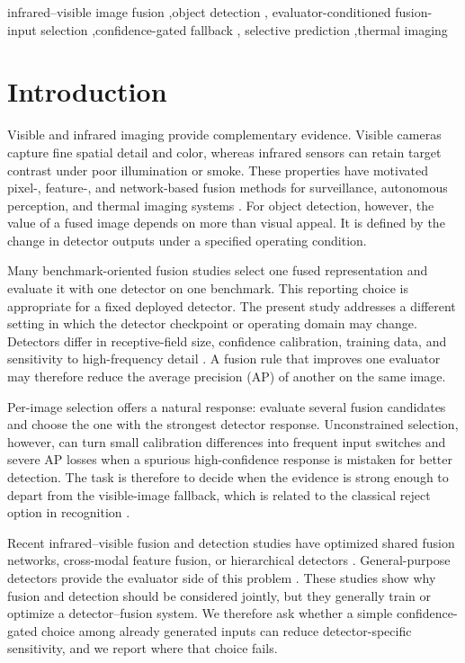 \documentclass[preprint,11pt]{elsarticle}
\begin{document}
\begin{frontmatter}
\begin{keyword}
infrared--visible image fusion \sep object detection \sep
evaluator-conditioned fusion-input selection \sep confidence-gated fallback \sep
selective prediction \sep thermal imaging
\end{keyword}

\end{frontmatter}

\section{Introduction}

Visible and infrared imaging provide complementary evidence. Visible cameras
capture fine spatial detail and color, whereas infrared sensors can retain
target contrast under poor illumination or smoke. These properties have
motivated pixel-, feature-, and network-based fusion methods for surveillance,
autonomous perception, and thermal imaging systems
\cite{ma2019survey,mudavath2026review,zhu2017tophat,zhang2020,ma2019fusiongan,li2019densefuse,xu2022u2fusion,li2021rfn,yi2024diffif,yang2025lfdt}.
For object detection, however, the value of a fused image depends on more than
visual appeal. It is defined by the change in detector outputs under a
specified operating condition.

Many benchmark-oriented fusion studies select one fused representation and
evaluate it with one detector on one benchmark. This reporting choice is
appropriate for a fixed deployed detector. The present study addresses a
different setting in which the detector checkpoint or operating domain may
change. Detectors differ in receptive-field size, confidence calibration,
training data, and sensitivity to high-frequency detail
\cite{abdar2021uncertainty,gawlikowski2023uncertainty}. A fusion rule that
improves one evaluator may therefore reduce the average precision (AP) of
another on the same image.

Per-image selection offers a natural response: evaluate several fusion
candidates and choose the one with the strongest detector response.
Unconstrained selection, however, can turn small calibration differences into
frequent input switches and severe AP losses when a spurious high-confidence
response is mistaken for better detection. The task is therefore to decide
when the evidence is strong enough to depart from the visible-image fallback,
which is related to the classical reject option in recognition
\cite{chow1970reject}.

Recent infrared--visible fusion and detection studies have optimized shared
fusion networks, cross-modal feature fusion, or hierarchical detectors
\cite{zhao2025cmifdf,gao2026coifsd,an2026mrtdetr,zhang2026hffn,wan2025yolo11rgbt}.
General-purpose detectors provide the evaluator side of this problem
\cite{redmon2016yolo,zhao2024rtdetr}. These studies show why fusion and
detection should be considered jointly, but they generally train or optimize a
detector--fusion system. We therefore ask whether a simple confidence-gated
choice among already generated inputs can reduce detector-specific sensitivity,
and we report where that choice fails.
\end{document}
